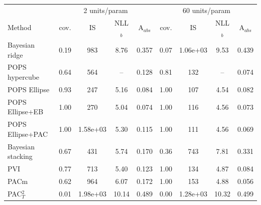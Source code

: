 
\begin{tabular}{lcccccccc}
\toprule
 & \multicolumn{4}{c}{2 units/param} & \multicolumn{4}{c}{60 units/param} \\
Method & cov. & IS & NLL$_b$ & A$_{abs}$ & cov. & IS & NLL$_b$ & A$_{abs}$ \\
\midrule
Bayesian ridge & 0.19 & 983 & 8.76 & 0.357 & 0.07 & 1.06e+03 & 9.53 & 0.439 \\
POPS hypercube & 0.64 & 564 & -- & 0.128 & 0.81 & 132 & -- & 0.074 \\
POPS Ellipse & 0.93 & 247 & 5.16 & 0.084 & 1.00 & 107 & 4.54 & 0.082 \\
POPS Ellipse+EB & 1.00 & 270 & 5.04 & 0.074 & 1.00 & 116 & 4.56 & 0.073 \\
POPS Ellipse+PAC & 1.00 & 1.58e+03 & 5.30 & 0.115 & 1.00 & 111 & 4.56 & 0.069 \\
Bayesian stacking & 0.67 & 431 & 5.74 & 0.170 & 0.36 & 743 & 7.81 & 0.331 \\
PVI & 0.77 & 713 & 5.40 & 0.123 & 1.00 & 134 & 4.87 & 0.084 \\
PACm & 0.62 & 964 & 6.07 & 0.172 & 1.00 & 153 & 4.88 & 0.056 \\
PAC$^2_T$ & 0.01 & 1.98e+03 & 10.14 & 0.489 & 0.00 & 1.28e+03 & 10.32 & 0.499 \\
\bottomrule
\end{tabular}

